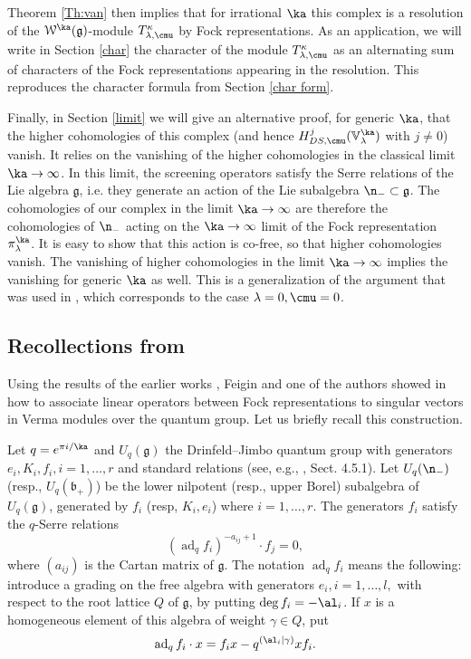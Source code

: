 \documentclass{amsart}
\newcommand{\on}{\operatorname}
\newcommand{\+}{\mathop{\oplus}}
\renewcommand{\*}{{\otimes}}
\newcommand{\mc}{\mathcal}
\newcommand{\mf}{\mathfrak}
\newcommand{\mb}{\mathbb}
\newcommand{\g}{\mf{g}}
\newcommand{\lam}{\lambda}
\def\b{{\mathfrak b}}
\theoremstyle{theorem}
\theoremstyle{remark}
\numberwithin{equation}{section}
\begin{document}
Theorem \ref{Th:van} then implies that for irrational $\ka$ this
complex is a resolution of the ${\mc W}^\ka(\g)$-module
$T^\kappa_{\lam,\cmu}$ by Fock representations.  As an application, we
will write in Section \ref{char} the character of the module
$T^\kappa_{\lam,\cmu}$ as an alternating sum of characters of the
Fock representations appearing in the resolution. This reproduces the
character formula from Section \ref{char form}.

Finally, in Section \ref{limit} we will give an alternative proof, for
generic $\ka$, that the higher cohomologies of this complex (and hence
$H^j_{DS,\cmu}({\mb V}^\ka_\lam)$ with $j \neq 0$) vanish. It relies
on the vanishing of the higher cohomologies in the classical limit
$\ka \to \infty$. In this limit, the screening operators satisfy the
Serre relations of the Lie algebra $\g$, i.e. they generate an action
of the Lie subalgebra $\n_- \subset \g$. The cohomologies of our
complex in the limit $\ka \to \infty$ are therefore the cohomologies
of $\n_-$ acting on the $\ka \to \infty$ limit of the Fock
representation $\pi^\ka_\lam$. It is easy to show that this action is
co-free, so that higher cohomologies vanish. The vanishing of higher
cohomologies in the limit $\ka \to \infty$ implies the vanishing for
generic $\ka$ as well. This is a generalization of the argument that
was used in \cite{FF93}, which corresponds to the case $\lam=0,
\cmu=0$.

\subsection{Recollections from \cite{FF93}}    \label{recoll}

Using the results of the earlier works \cite{BMP,SV,Varchenko}, Feigin
and one of the authors showed in \cite{FF93} how to associate linear
operators between Fock representations to singular vectors in Verma
modules over the quantum group. Let us briefly recall this
construction.

Let $q=e^{\pi i/\ka}$ and $U_q(\g)$ the Drinfeld--Jimbo quantum group
with generators $e_i, K_i, f_i, i=1,\dots,r$ and standard relations
(see, e.g., \cite{FF93}, Sect. 4.5.1). Let $U_q(\n_-)$ (resp.,
$U_q(\b_+)$) be the lower nilpotent (resp., upper Borel) subalgebra of
$U_q(\g)$, generated by $f_i$ (resp, $K_i, e_i$) where
$i=1,\dots,r$. The generators $f_i$ satisfy the $q$-Serre relations
\begin{equation}    \label{quantumserre}
(\on{ad}_q f_i)^{-a_{ij}+1} \cdot f_j = 0,
\end{equation}
where $(a_{ij})$ is the Cartan matrix of $\g$. The notation
$\on{ad}_q f_i$ means the following: introduce a grading on the free
algebra with generators $e_i, i=1,\dots,l,$ with respect to the root
lattice $Q$ of $\g$, by putting $\deg f_i = -\al_i$. If $x$ is a
homogeneous element of this algebra of weight $\gamma \in Q$,
put $$\on{ad}_q f_i \cdot x = f_i x - q^{(\al_i|\gamma)} x f_i.$$
\end{document}
